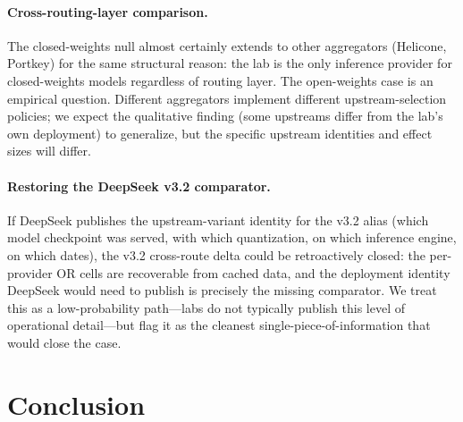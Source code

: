 \documentclass[11pt,a4paper]{article}
\begin{document}
\paragraph{Cross-routing-layer comparison.} The closed-weights null almost certainly extends to other aggregators (Helicone, Portkey) for the same structural reason: the lab is the only inference provider for closed-weights models regardless of routing layer. The open-weights case is an empirical question. Different aggregators implement different upstream-selection policies; we expect the qualitative finding (some upstreams differ from the lab's own deployment) to generalize, but the specific upstream identities and effect sizes will differ.

\paragraph{Restoring the DeepSeek v3.2 comparator.} If DeepSeek publishes the upstream-variant identity for the v3.2 alias (which model checkpoint was served, with which quantization, on which inference engine, on which dates), the v3.2 cross-route delta could be retroactively closed: the per-provider OR cells are recoverable from cached data, and the deployment identity DeepSeek would need to publish is precisely the missing comparator. We treat this as a low-probability path---labs do not typically publish this level of operational detail---but flag it as the cleanest single-piece-of-information that would close the case.

\section{Conclusion}
\label{sec:conclusion}
\end{document}
